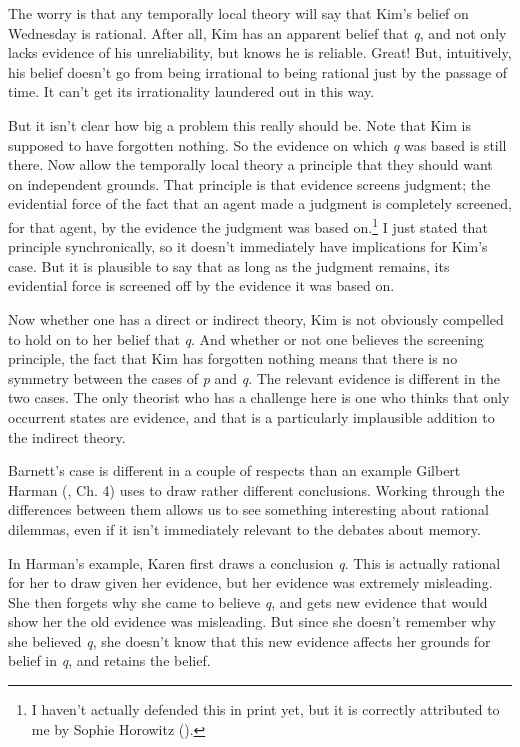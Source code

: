 \documentclass[
  11pt,
  letterpaper,
  DIV=11,
  numbers=noendperiod,
  twoside]{scrartcl}
\begin{document}
The worry is that any temporally local theory will say that Kim's belief
on Wednesday is rational. After all, Kim has an apparent belief that
\emph{q}, and not only lacks evidence of his unreliability, but knows he
is reliable. Great! But, intuitively, his belief doesn't go from being
irrational to being rational just by the passage of time. It can't get
its irrationality laundered out in this way.

But it isn't clear how big a problem this really should be. Note that
Kim is supposed to have forgotten nothing. So the evidence on which
\emph{q} was based is still there. Now allow the temporally local theory
a principle that they should want on independent grounds. That principle
is that evidence screens judgment; the evidential force of the fact that
an agent made a judgment is completely screened, for that agent, by the
evidence the judgment was based on.\footnote{I haven't actually defended
  this in print yet, but it is correctly attributed to me by Sophie
  Horowitz ().} I just stated that
principle synchronically, so it doesn't immediately have implications
for Kim's case. But it is plausible to say that as long as the judgment
remains, its evidential force is screened off by the evidence it was
based on.

Now whether one has a direct or indirect theory, Kim is not obviously
compelled to hold on to her belief that \emph{q}. And whether or not one
believes the screening principle, the fact that Kim has forgotten
nothing means that there is no symmetry between the cases of \emph{p}
and \emph{q}. The relevant evidence is different in the two cases. The
only theorist who has a challenge here is one who thinks that only
occurrent states are evidence, and that is a particularly implausible
addition to the indirect theory.

Barnett's case is different in a couple of respects than an example
Gilbert Harman (, Ch. 4) uses to draw
rather different conclusions. Working through the differences between
them allows us to see something interesting about rational dilemmas,
even if it isn't immediately relevant to the debates about memory.

In Harman's example, Karen first draws a conclusion \emph{q}. This is
actually rational for her to draw given her evidence, but her evidence
was extremely misleading. She then forgets why she came to believe
\emph{q}, and gets new evidence that would show her the old evidence was
misleading. But since she doesn't remember why she believed \emph{q},
she doesn't know that this new evidence affects her grounds for belief
in \emph{q}, and retains the belief.
\end{document}
